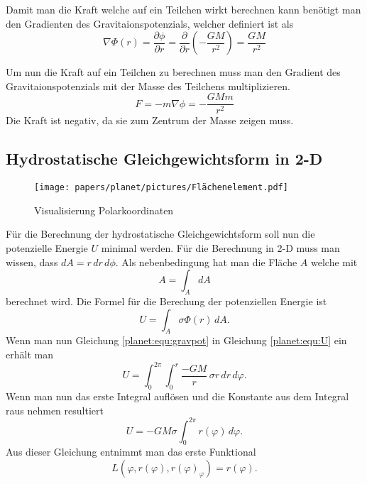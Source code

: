 Damit man die Kraft welche auf ein Teilchen wirkt berechnen kann benötigt man den Gradienten des Gravitaionspotenzials, welcher definiert ist als
\begin{equation*}
	\nabla \Phi (r) = \frac{\partial \phi}{\partial r} = \frac{\partial}{\partial r} (-\frac{GM}{r^2}) = \frac{GM}{r^2}
\end{equation*}

Um nun die Kraft auf ein Teilchen zu berechnen muss man den Gradient des Gravitaionspotenzials mit der Masse des Teilchens multiplizieren.
\begin{equation*}
	F = -m\nabla \phi = -\frac{GMm}{r^2}
\end{equation*}
Die Kraft ist negativ, da sie zum Zentrum der Masse zeigen muss.


\subsection{Hydrostatische Gleichgewichtsform in 2-D}
\begin{figure}
	\centering
	\texttt{[image: papers/planet/pictures/Flächenelement.pdf]}
	\caption{Visualisierung Polarkoordinaten}
\end{figure}
Für die Berechnung der hydrostatische Gleichgewichtsform soll nun die potenzielle Energie \(U\) minimal werden.
Für die Berechnung in 2-D muss man wissen, dass \(dA = r \, dr \, d\phi\).
Als nebenbedingung hat man die Fläche \(A\) welche mit 
\begin{equation}
	A = \int_{A}^{} dA
	\label{planet:equ:A}
\end{equation}
berechnet wird.
Die Formel für die Berechung der potenziellen Energie ist
\begin{equation*}
	U = \int_{A} \sigma  \Phi (r) \, dA.
	\label{planet:equ:U}
\end{equation*}
Wenn man nun Gleichung \ref{planet:equ:gravpot} in Gleichung \ref{planet:equ:U} ein erhält man
\begin{equation*}
	U = \int_{0}^{2\pi}\int_{0}^{r} \frac{-GM}{r} \, \sigma r \, dr \, d\varphi.
\end{equation*}
Wenn man nun das erste Integral auflösen und die Konstante aus dem Integral raus nehmen resultiert 
\begin{equation}
	U =-GM\sigma \int_{0}^{2\pi} r(\varphi) \, d\varphi .
\end{equation}
Aus dieser Gleichung entnimmt man das erste Funktional
\begin{equation}
	L(\varphi ,r(\varphi),r(\varphi)_\varphi) = r(\varphi).
\end{equation}
